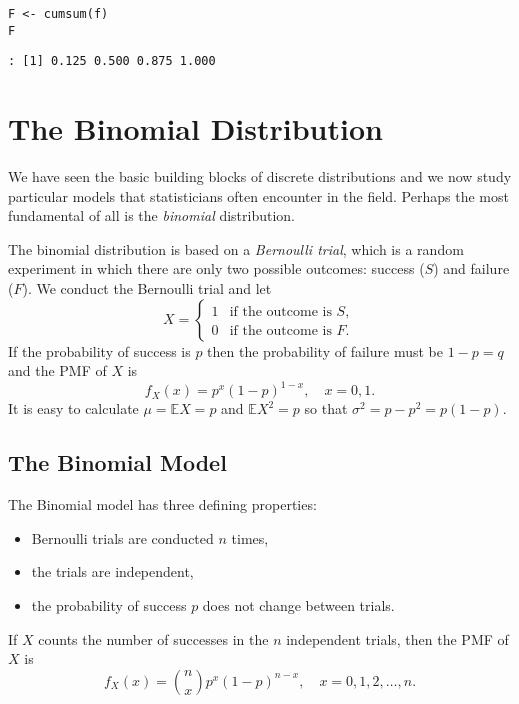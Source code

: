 \begin{Verbatim}
F <- cumsum(f)
F
\end{Verbatim}

\begin{verbatim}
: [1] 0.125 0.500 0.875 1.000
\end{verbatim}

\section{The Binomial Distribution}
\label{sec-5-3}

We have seen the basic building blocks of discrete distributions and
we now study particular models that statisticians often encounter in
the field.
Perhaps the most fundamental of all is the \emph{binomial} distribution.

The binomial distribution is based on a \emph{Bernoulli trial}, which is a
random experiment in which there are only two possible outcomes:
success (\(S\)) and failure (\(F\)). We conduct the Bernoulli trial
and let \begin{equation} X = \begin{cases} 1 & \mbox{if the outcome is $S$},\\ 0 & \mbox{if the outcome is $F$}. \end{cases} \end{equation}
If the probability of success is \(p\) then the probability of failure
must be \(1-p=q\) and the PMF of \(X\) is
\begin{equation}
f_{X}(x)=p^{x}(1-p)^{1-x},\quad x=0,1.
\end{equation}
It is easy to calculate \(\mu=\mathbb{E} X=p\) and \(\mathbb{E}
X^{2}=p\) so that \(\sigma^{2}=p-p^{2}=p(1-p)\).

\subsection{The Binomial Model}
\label{sec-5-3-1}

The Binomial model has three defining properties:
\begin{itemize}
\item Bernoulli trials are conducted \(n\) times,
\item the trials are independent,
\item the probability of success \(p\) does not change between trials.
\end{itemize}
If \(X\) counts the number of successes in the \(n\) independent
trials, then the PMF of \(X\) is 
\begin{equation}
f_{X}(x)={n \choose x}p^{x}(1-p)^{n-x},\quad x=0,1,2,\ldots,n.
\end{equation}

